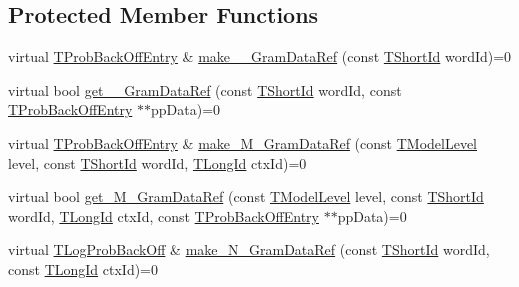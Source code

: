 \subsection*{Protected Member Functions}
\begin{DoxyCompactItemize}
\item 
virtual \hyperlink{structuva_1_1smt_1_1tries_1_1_t_prob_back_off_entry}{T\+Prob\+Back\+Off\+Entry} \& \hyperlink{classuva_1_1smt_1_1tries_1_1_a_layered_trie_ac555233f27ab1e5cb275823df7ab73db}{make\+\_\+\_\+\+Gram\+Data\+Ref} (const \hyperlink{namespaceuva_1_1smt_1_1hashing_adcf22e1982ad09d3a63494c006267469}{T\+Short\+Id} word\+Id)=0
\item 
virtual bool \hyperlink{classuva_1_1smt_1_1tries_1_1_a_layered_trie_a2f867efeae78d2db790cec7f844314db}{get\+\_\+\_\+\+Gram\+Data\+Ref} (const \hyperlink{namespaceuva_1_1smt_1_1hashing_adcf22e1982ad09d3a63494c006267469}{T\+Short\+Id} word\+Id, const \hyperlink{structuva_1_1smt_1_1tries_1_1_t_prob_back_off_entry}{T\+Prob\+Back\+Off\+Entry} $\ast$$\ast$pp\+Data)=0
\item 
virtual \hyperlink{structuva_1_1smt_1_1tries_1_1_t_prob_back_off_entry}{T\+Prob\+Back\+Off\+Entry} \& \hyperlink{classuva_1_1smt_1_1tries_1_1_a_layered_trie_afa0945f32d41fc20c8ce13bf0eda7b2e}{make\+\_\+\+M\+\_\+\+Gram\+Data\+Ref} (const \hyperlink{namespaceuva_1_1smt_1_1tries_a20577a44b3a42d26524250634379b7cb}{T\+Model\+Level} level, const \hyperlink{namespaceuva_1_1smt_1_1hashing_adcf22e1982ad09d3a63494c006267469}{T\+Short\+Id} word\+Id, \hyperlink{namespaceuva_1_1smt_1_1hashing_a5992ac0dea0fb3226fb403ede09fad55}{T\+Long\+Id} ctx\+Id)=0
\item 
virtual bool \hyperlink{classuva_1_1smt_1_1tries_1_1_a_layered_trie_a05855f2069930d51739f040ce34de3dc}{get\+\_\+\+M\+\_\+\+Gram\+Data\+Ref} (const \hyperlink{namespaceuva_1_1smt_1_1tries_a20577a44b3a42d26524250634379b7cb}{T\+Model\+Level} level, const \hyperlink{namespaceuva_1_1smt_1_1hashing_adcf22e1982ad09d3a63494c006267469}{T\+Short\+Id} word\+Id, \hyperlink{namespaceuva_1_1smt_1_1hashing_a5992ac0dea0fb3226fb403ede09fad55}{T\+Long\+Id} ctx\+Id, const \hyperlink{structuva_1_1smt_1_1tries_1_1_t_prob_back_off_entry}{T\+Prob\+Back\+Off\+Entry} $\ast$$\ast$pp\+Data)=0
\item 
virtual \hyperlink{namespaceuva_1_1smt_1_1tries_acd0660255dd9ef5d644f01de49102750}{T\+Log\+Prob\+Back\+Off} \& \hyperlink{classuva_1_1smt_1_1tries_1_1_a_layered_trie_a534dd252748652d2c3a5afc373ac5ca7}{make\+\_\+\+N\+\_\+\+Gram\+Data\+Ref} (const \hyperlink{namespaceuva_1_1smt_1_1hashing_adcf22e1982ad09d3a63494c006267469}{T\+Short\+Id} word\+Id, const \hyperlink{namespaceuva_1_1smt_1_1hashing_a5992ac0dea0fb3226fb403ede09fad55}{T\+Long\+Id} ctx\+Id)=0

\end{DoxyCompactItemize}
